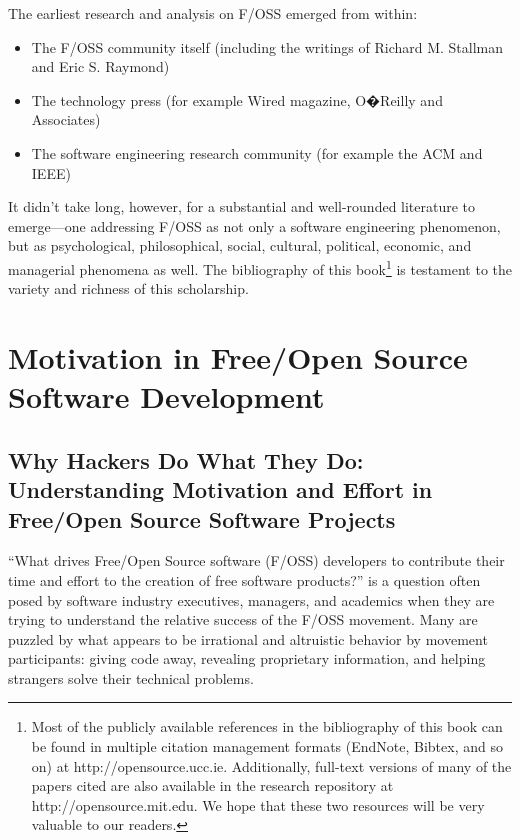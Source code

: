 \documentclass{mitpress}
\begin{document}
\begin{introduction}
The earliest research and analysis on F/OSS emerged from
within:
\begin{itemize}
\item
The F/OSS community itself (including the writings of Richard M.
Stallman and Eric S. Raymond)

\item
The technology press (for example Wired magazine, O�Reilly and Associates)

\item
 The software engineering research community (for example the ACM and
IEEE)
\end{itemize}
It didn't take long, however, for a substantial and well-rounded literature
to emerge---one addressing F/OSS as not only a software engineering phenomenon,
but as psychological, philosophical, social, cultural, political,
economic, and managerial phenomena as well. The bibliography of this
book\footnote{Most of the publicly available references 
in the bibliography of
this book can be found in multiple citation management formats (EndNote,
Bibtex, and so on) at http://opensource.ucc.ie. Additionally, full-text
versions of many of the papers cited are also available in the research
repository at http://opensource.mit.edu.  We hope that these two resources
will be very valuable to our readers.}
is testament to the variety and richness of this scholarship.

\endnotes

\end{introduction}




\part{Motivation in Free/Open Source Software Development}


\chapter[Why Hackers Do What They Do:
Understanding Motivation and Effort in Free/Open Source Software
Projects]
{Why Hackers Do What They Do:\\ Understanding
Motivation and Effort in Free/Open Source Software
Projects}


``What drives Free/Open Source software (F/OSS) developers to contribute
their time and effort to the creation of free software products?'' 
is a question
often posed by software industry executives, managers, and academics
when they are trying to understand the relative success of the F/OSS movement.
Many are puzzled by what appears to be irrational and altruistic
behavior by movement participants: giving code away, revealing proprietary
information, and helping strangers solve their technical problems.
\end{document}
